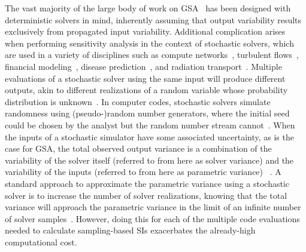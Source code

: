 The vast majority of the large body of work on GSA~\cite{saltelli-etal-2008, helton-2008, ionescu-cacuci-2004, cacuci-ionescu-2004} has been designed with deterministic solvers in mind, inherently assuming that output variability results exclusively from propagated input variability. 
Additional complication arises when performing sensitivity analysis in the context of stochastic solvers, which are used in a variety of disciplines such as compute networks~\cite{crussell-etal-2019, geraci-etal-2021}, turbulent flows~\cite{lattanzi-subramaniam-2023}, financial modeling~\cite{korn-etal-2010}, disease prediction~\cite{tripathy-etal-2020}, and radiation transport~\cite{lewis-miller-1993}. 
Multiple evaluations of a stochastic solver using the same input will produce different outputs, akin to different realizations of a random variable whose probability distribution is unknown~\cite{larsen-marx-2012}.
In computer codes, stochastic solvers simulate randomness using (pseudo-)random number generators, where the initial seed could be chosen by the analyst but the random number stream cannot~\cite{owen-2013-textbook}.
When the inputs of a stochastic simulator have some associated uncertainty, as is the case for GSA, the total observed output variance is a combination of the variability of the solver itself (referred to from here as solver variance) and the variability of the inputs (referred to from here as parametric variance) ~\cite{rochman-etal-2014, clements-etal-2024}. 
A standard approach to approximate the parametric variance using a stochastic solver is to increase the number of solver realizations, knowing that the total variance will approach the parametric variance in the limit of an infinite number of solver samples~\cite{rainforth-etal-2018}.
However, doing this for each of the multiple code evaluations needed to calculate sampling-based SIs exacerbates the already-high computational cost.

